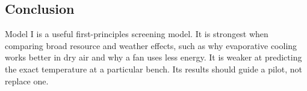 \subsection{Conclusion}
 
Model I is a useful first-principles screening model. It is strongest when comparing broad resource and weather effects, such as why evaporative cooling works better in dry air and why a fan uses less energy. It is weaker at predicting the exact temperature at a particular bench. Its results should guide a pilot, not replace one.
 